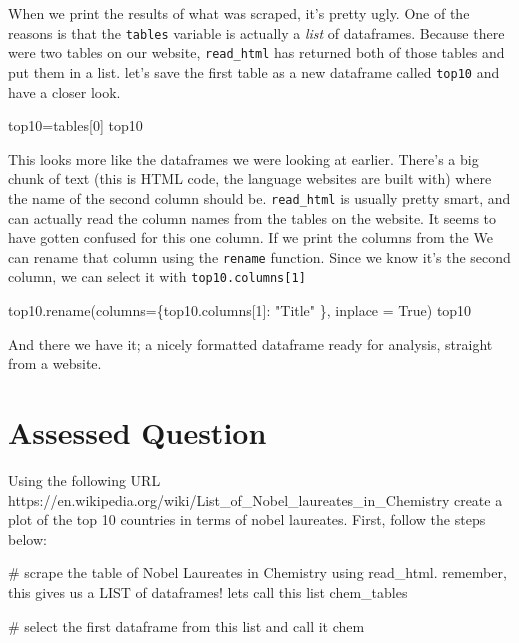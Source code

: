 \documentclass[
  letterpaper,
  DIV=11,
  numbers=noendperiod]{scrreprt}
\newenvironment{Shaded}{\begin{snugshade}}{\end{snugshade}}
\newcommand{\CommentTok}[1]{\textcolor[rgb]{0.37,0.37,0.37}{#1}}
\newcommand{\DecValTok}[1]{\textcolor[rgb]{0.68,0.00,0.00}{#1}}
\newcommand{\NormalTok}[1]{\textcolor[rgb]{0.00,0.23,0.31}{#1}}
\newcommand{\OperatorTok}[1]{\textcolor[rgb]{0.37,0.37,0.37}{#1}}
\newcommand{\StringTok}[1]{\textcolor[rgb]{0.13,0.47,0.30}{#1}}
\newcommand{\VariableTok}[1]{\textcolor[rgb]{0.07,0.07,0.07}{#1}}
\begin{document}
When we print the results of what was scraped, it's pretty ugly. One of
the reasons is that the \texttt{tables} variable is actually a
\emph{list} of dataframes. Because there were two tables on our website,
\texttt{read\_html} has returned both of those tables and put them in a
list. let's save the first table as a new dataframe called
\texttt{top10} and have a closer look.

\begin{Shaded}
\begin{Highlighting}[]
\NormalTok{top10}\OperatorTok{=}\NormalTok{tables[}\DecValTok{0}\NormalTok{]}
\NormalTok{top10}
\end{Highlighting}
\end{Shaded}

This looks more like the dataframes we were looking at earlier. There's
a big chunk of text (this is HTML code, the language websites are built
with) where the name of the second column should be. \texttt{read\_html}
is usually pretty smart, and can actually read the column names from the
tables on the website. It seems to have gotten confused for this one
column. If we print the columns from the We can rename that column using
the \texttt{rename} function. Since we know it's the second column, we
can select it with \texttt{top10.columns{[}1{]}}

\begin{Shaded}
\begin{Highlighting}[]
\NormalTok{top10.rename(columns}\OperatorTok{=}\NormalTok{\{top10.columns[}\DecValTok{1}\NormalTok{]: }\StringTok{"Title"}\NormalTok{ \}, inplace }\OperatorTok{=} \VariableTok{True}\NormalTok{)}
\NormalTok{top10}
\end{Highlighting}
\end{Shaded}

And there we have it; a nicely formatted dataframe ready for analysis,
straight from a website.


\hypertarget{assessed-question-1}{%
\chapter{Assessed Question}\label{assessed-question-1}}

Using the following URL
https://en.wikipedia.org/wiki/List\_of\_Nobel\_laureates\_in\_Chemistry
create a plot of the top 10 countries in terms of nobel laureates.
First, follow the steps below:

\begin{Shaded}
\begin{Highlighting}[]
\CommentTok{\# scrape the table of Nobel Laureates in Chemistry using read\_html. remember, this gives us a LIST of dataframes! lets call this list chem\_tables}

\CommentTok{\# select the first dataframe from this list and call it chem}
\end{Highlighting}
\end{Shaded}
\end{document}
